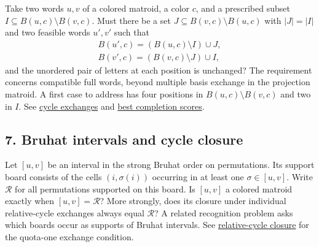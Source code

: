Take two words $u,v$ of a colored matroid, a color $c$, and a prescribed
subset $I\subseteq B(u,c)\setminus B(v,c)$. Must there be a set
$J\subseteq B(v,c)\setminus B(u,c)$ with $|J|=|I|$ and two feasible words
$u',v'$ such that
\[
 \begin{gathered}
 B(u',c)=(B(u,c)\setminus I)\cup J,\\
 B(v',c)=(B(v,c)\setminus J)\cup I,
 \end{gathered}
\]
and the unordered pair of letters at each position is unchanged?
The requirement concerns compatible full words, beyond multiple basis
exchange in the projection matroid. A first case to address has four
positions in $B(u,c)\setminus B(v,c)$ and two in $I$.
See \href{exchange-graphs.htm}{cycle exchanges} and
\href{rank-flats.htm#valuatedCompletions}{best completion scores}.

\subsection[problem7]{7. Bruhat intervals and cycle closure}

Let $[u,v]$ be an interval in the strong Bruhat order on permutations.
Its support board consists of the cells $(i,\sigma(i))$ occurring in at
least one $\sigma\in[u,v]$. Write $\mathcal R$ for all permutations
supported on this board. Is $[u,v]$ a colored matroid exactly when
$[u,v]=\mathcal R$? More strongly, does its closure under individual
relative-cycle exchanges always equal $\mathcal R$?
A related recognition problem asks which boards occur as supports of
Bruhat intervals. See
\href{permutations.htm#relativeCycles}{relative-cycle closure} for the
quota-one exchange condition.
